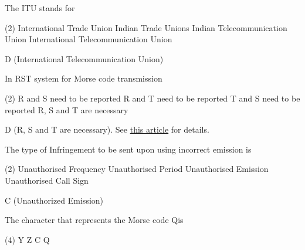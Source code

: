 \documentclass[a4paper]{article}
\begin{document}
\vspace{5mm}



\begin{question}The ITU stands for \spaces
	\begin{tasks}(2)
		\task International Trade Union
		\task Indian Trade Unions
		\task Indian Telecommunication Union
		\task International Telecommunication Union
	\end{tasks}
\end{question}

\begin{solution}
	D (International Telecommunication Union)
\end{solution}

\vspace{5mm}



\begin{question}In RST system for Morse code transmission
	\begin{tasks}(2)
		\task R and S need to be reported
		\task R and T need to be reported
		\task T and S need to be reported
		\task R, S and T are necessary
	\end{tasks}
\end{question}

\begin{solution}
	D (R, S and T are necessary). See \href{https://en.wikipedia.org/wiki/R-S-T_system}{this article} for details.
\end{solution}

\vspace{5mm}



\begin{question}The type of Infringement to be sent upon using incorrect emission is \spaces
	\begin{tasks}(2)
		\task Unauthorised Frequency
		\task Unauthorised Period
		\task Unauthorised Emission
		\task Unauthorised Call Sign
	\end{tasks}
\end{question}

\begin{solution}
	C (Unauthorized Emission)
\end{solution}

\vspace{5mm}



\begin{question}The character that represents the Morse code {\Large\morse Q}\hspace{-0.25em}is \spaces
	\begin{tasks}(4)
		\task Y
		\task Z
		\task C
		\task Q
	\end{tasks}
\end{question}
\end{document}
